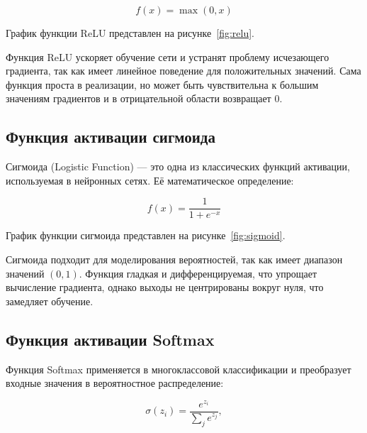 \begin{equation}
    f(x) = \max(0, x)
\end{equation}

График функции ReLU представлен на рисунке~\ref{fig:relu}.


Функция ReLU ускоряет обучение сети и устранят проблему исчезающего градиента, 
так как имеет линейное поведение для положительных значений. Сама функция 
проста в реализации, но может быть чувствительна к большим значениям градиентов
и в отрицательной области возвращает 0.

\subsection{Функция активации сигмоида}
\hspace*{12.5 mm}Сигмоида (Logistic Function) — это одна из классических 
функций активации, используемая в нейронных сетях. Её математическое 
определение:

\begin{equation}
    f(x) = \frac{1}{1 + e^{-x}}
\end{equation}

График функции сигмоида представлен на рисунке~\ref{fig:sigmoid}.


Сигмоида подходит для моделирования вероятностей, так как имеет диапазон 
значений $ (0,1) $. Функция гладкая и дифференцируемая, что упрощает вычисление
градиента, однако выходы не центрированы вокруг нуля, что замедляет обучение.

\subsection{Функция активации Softmax}
\hspace*{12.5 mm}Функция Softmax применяется в многоклассовой классификации и 
преобразует входные значения в вероятностное распределение:

\begin{equation}
    \sigma{(z_i)} = \frac{e^{z_i}}{\sum_{j} e^{z_j}},
\end{equation}

